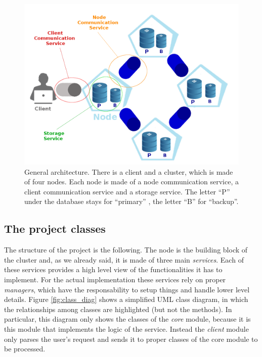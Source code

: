 \documentclass{article}
\begin{document}
\begin{figure}[h]
\centerline{\includegraphics[scale=0.41]{architecture}}
\caption{General architecture. There is a client and a cluster, which is made of four nodes. Each node is made of a node communication service, a client communication service and a storage service. The letter ``P'' under the database stays for ``primary'' , the letter ``B'' for ``backup''.}
\label{fig:architecture}
\end{figure}

\subsection{The project classes} 
The structure of the project is the following. The node is the building block of the cluster and, as we already said, it is made of three main \textit{services}. Each of these services provides a high level view of the functionalities it has to implement. For the actual implementation these services rely on proper \textit{managers}, which have the responsability to setup things and handle lower level details. Figure \ref{fig:class_diag} shows a simplified UML class diagram, in which the relationships among classes are highlighted (but not the methods). In particular, this diagram only shows the classes of the \textit{core} module, because it is this module that implements the logic of the service. Instead the \textit{client} module only parses the user's request and sends it to proper classes of the core module to be processed. \\
\end{document}

